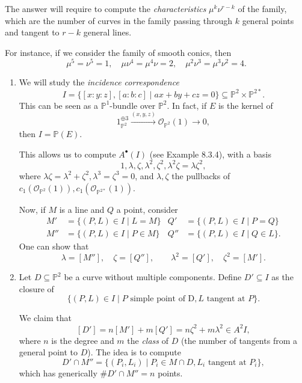 \documentclass[leqno, openany]{memoir}
\theoremstyle{definition}
\theoremstyle{remark}
\theoremstyle{plain}
\theoremstyle{definition}
\theoremstyle{remark}
\renewcommand{\P}{\mathbb{P}}
\newcommand{\mc}[1]{\mathcal{#1}}
\begin{document}
The answer will require to compute the \emph{characteristics} $\mu^k \nu^{r-k}$ of the family, which are the number of curves in the family passing through $k$ general points and tangent to $r-k$ general lines. 

For instance, if we consider the family of smooth conics, then
\[ \mu^5 = \nu^5 = 1, \quad \mu\nu^4=\mu^4\nu=2, \quad \mu^2\nu^3=\mu^3\nu^2=4. \]

\begin{enumerate}
    \item We will study the \emph{incidence correspondence} 
\[ I=\{[x:y:z], [a:b:c] \mid ax+by+cz=0\} \subseteq \P^2 \times \P^{2\ast}. \]
This can be seen as a $\P^1$-bundle over $\P^2$. In fact, if $E$ is the kernel of
\[ 1_{\P^2}^{\oplus 3} \xrightarrow{(x, y, z)} \mc{O}_{\P^2}(1) \to 0, \]
then $I=\P(E)$. 

This allows us to compute $A^\bullet(I)$ (see Example 8.3.4), with a basis 
\[ 1, \lambda, \zeta, \lambda^2, \zeta^2, \lambda^2\zeta=\lambda\zeta^2, \]
where $\lambda\zeta=\lambda^2+\zeta^2, \lambda^3=\zeta^3=0$, and $\lambda, \zeta$ the pullbacks of $c_1(\mc{O}_{\P^2}(1)), c_1(\mc{O}_{\P^{2\ast}}(1))$. 

Now, if $M$ is a line and $Q$ a point, consider
\begin{align*}
M' &= \{(P, L) \in I \mid L=M\} & Q' &= \{(P, L) \in I \mid P=Q\} \\
M'' &= \{(P, L) \in I \mid P \in M\} & Q'' &= \{(P, L) \in I \mid Q \in L\}.
\end{align*}
One can show that
\[ \lambda=[M''], \quad \zeta = [Q''], \qquad \lambda^2=[Q'], \quad \zeta^2 = [M']. \]
    \item Let $D \subseteq \P^2$ be a curve without multiple components. Define $D' \subseteq I$ as the closure of
\[ \{(P, L) \in I \mid P \text{ simple point of D}, L \text{ tangent at }P\}. \]

We claim that
\[ [D'] = n[M']+m[Q'] = n\zeta^2+m \lambda^2 \in A^2I, \]
where $n$ is the degree and $m$ the \emph{class} of $D$ (the number of tangents from a general point to $D$). The idea is to compute 
\[ D' \cap M'' = \{(P_i, L_i) \mid P_i \in M \cap D, L_i \text{ tangent at }P_i\}, \]
which has generically $\# D' \cap M''=n$ points.  


\end{enumerate}
\end{document}
